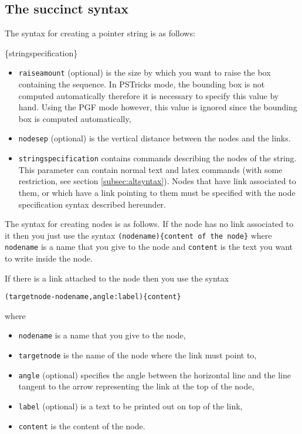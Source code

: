\subsection{The succinct syntax}
The syntax for creating a pointer string is as follows:
\begin{command}{\Pstr[raiseamount][nodesep]\{stringspecification\}}
\begin{itemize}
\item  \verb|raiseamount| (optional) is the size by which you want
to raise the box containing the sequence. In
PSTricks mode, the bounding box is not computed automatically therefore
it is necessary to specify this value by hand. Using the PGF mode
 however, this value is ignored since the bounding box
is computed automatically,
\item  \verb|nodesep| (optional) is the vertical distance between
the nodes and the links.
\item  \verb|stringspecification| contains commands describing the nodes
of the string.
This parameter can contain normal text and latex commands (with some restriction, see section \ref{subsec:altsyntax}).
Nodes that have link associated to them, or which have a link pointing to them
must be specified with the node specification syntax described hereunder.\end{itemize}
\end{command}

The syntax for creating nodes is as follows.
If the node has no link associated to it then you just use
the syntax \verb|(nodename){content of the node}| where \verb|nodename| is a name that you give to the node and \verb|content| is the text you want to write inside the node.

If there is a link attached to the node then you use
the syntax
\begin{verbatim}
(targetnode-nodename,angle:label){content}
\end{verbatim}
where
\begin{itemize}
\item \verb|nodename| is a name that you give to the node,
\item \verb|targetnode| is the name of the node where the link must point to,
\item \verb|angle| (optional) specifies the angle between the horizontal line and the line
tangent to the arrow representing the link at the top of the node,
\item  \verb|label| (optional) is a text to be printed out on top of the link,
\item \verb|content| is the content of the node.
\end{itemize}

